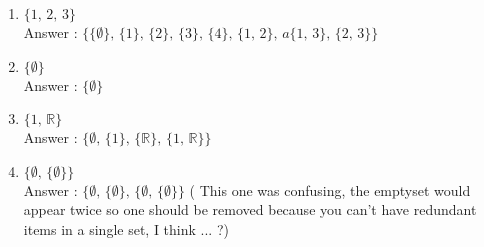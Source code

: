 \documentclass[a4paper,11pt]{article}
\begin{document}
\begin{enumerate}
  \begin{enumerate}
  \item $ \lbrace 1 \text{, } 2 \text{, } 3 \rbrace$ \\
  Answer : $ \lbrace 
   \lbrace \emptyset \rbrace \text{, } 
   \lbrace 1 \rbrace \text{, } 
   \lbrace 2 \rbrace \text{, } 
   \lbrace 3 \rbrace \text{, } 
   \lbrace 4 \rbrace \text{, } 
   \lbrace 1 \text{, } 2 \rbrace \text{, } a 
   \lbrace 1 \text{, } 3 \rbrace \text{, } 
   \lbrace 2 \text{, } 3 \rbrace
   \rbrace$
   \item $ \lbrace \emptyset \rbrace$ \\
   Answer : $ \lbrace\emptyset \rbrace$
   \item $ \lbrace 1 \text{, } \mathbb{R} \rbrace$ \\
   Answer : $ \lbrace
   \emptyset \text{, }
   \lbrace 1  \rbrace \text{, } 
   \lbrace \mathbb{R}  \rbrace \text{, }
   \lbrace 1 \text{, } \mathbb{R} \rbrace 
   \rbrace$
   \item $ \lbrace \emptyset \text{, } \lbrace \emptyset \rbrace \rbrace$ \\
   Answer : $ \lbrace
   \emptyset \text{, } 
   \lbrace \emptyset \rbrace \text{, } 
   \lbrace \emptyset \text{, } \lbrace \emptyset \rbrace
   \rbrace$ ( This one was confusing, the emptyset would appear twice so one should be removed because you can't have redundant items in a single set, I think ... ?)
  \end{enumerate}

\end{enumerate}
\end{document}
